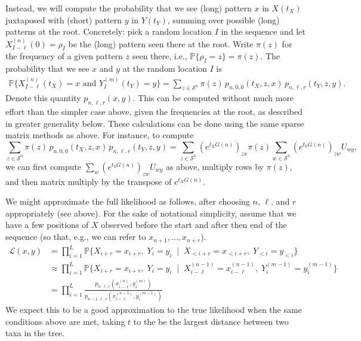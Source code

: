 \documentclass{article}
\renewcommand{\P}{\mathbb{P}}
\newcommand{\calS}{\mathcal{S}}  %
\newcommand{\given}{\;\mid\;}
\newcommand{\like}{\mathcal L}
\theoremstyle{plain}
\theoremstyle{definition}
\begin{document}
Instead, we will compute the probability that
we see (long) pattern $x$ in $X(t_X)$ juxtaposed with (short) pattern $y$ in $Y(t_Y)$,
summing over possible (long) patterns at the root.
Concretely: pick a random location $I$ in the sequence
and let $X_{I-\ell}^{(n)}(0) = \rho_I$ be the (long) pattern seen there at the root.
Write $\pi(z)$ for the frequency of a given pattern $z$ seen there, i.e., $\P\{\rho_I=z\}=\pi(z)$.
The probability that we see $x$ and $y$ at the random location $I$ is
\begin{align} \label{eqn:phylo_likelihood}
    \P\{X_{I-\ell}^{(n)}(t_X)=x \text{ and } Y_I^{(m)}(t_Y)=y \}
    =
    \sum_{z \in \calS^{n}} \pi(z) \, p_{n,0,0}(t_X,z,x) \, p_{n,\ell,r}(t_Y,z,y) .
\end{align}
Denote this quantity $p_{n,\ell,r}(x, y)$.
This can be computed without much more effort than the simpler case above,
given the frequencies at the root, as described in greater generality below.
These calculations can be done using the same sparse matrix methods as above.
For instance, to compute
\[
    \sum_{z \in \calS^{n}}
        \pi(z) \, p_{n,0,0}(t_X,z,x) \, p_{n,\ell,r}(t_Y,z,y)
    =
    \sum_{z \in \calS^{n}}
    \left( e^{t_X G(n)} \right)_{zx}
    \pi(z)
    \sum_{w \in \calS^{n}} \left( e^{t_Y G(n)} \right)_{zw} U_{wy} ,
\]
we can first compute $\sum_w \left( e^{t_Y G(n)} \right)_{zw} U_{wy}$ as above,
multiply rows by $\pi(z)$, and then matrix multiply by the transpose of $e^{t_X G(n)}$.

We might approximate the full likelihood as follows,
after choosing $n$, $\ell$, and $r$ appropriately (see above).
For the sake of notational simplicity, assume that we have a few positions
of $X$ observed before the start and after then end of the sequence
(so that, e.g., we can refer to $x_{n+1}, \ldots, x_{n+r}$).
\begin{align*}
    \like(x, y)
    &=
    \prod_{i=1}^L
        \P\{ X_{i+r} = x_{i+r},\; Y_i = y_i
            \given X_{<i+r} = x_{<i+r},\; Y_{<i} = y_{<i} \} \\
    &\approx
    \prod_{i=1}^L
        \P\{ X_{i+r} = x_{i+r},\; Y_i = y_i
            \given X_{i-\ell}^{(n-1)} = x_{i-\ell}^{(n-1)},\; Y_{i}^{(m-1)} = y_{i}^{(m-1)} \} \\
    &=
    \prod_{i=1}^L
    \frac{
        p_{n,\ell,r}\left( x_{i-\ell}^{(n)}, y_i^{(m)} \right)
    }{
        p_{n-1,\ell,r}\left( x_{i-\ell}^{(n-1)}, y_i^{(m-1)} \right)
    }
\end{align*}
We expect this to be a good approximation to the true likelihood
when the same conditions above are met, taking $t$ to the be the largest distance
between two taxa in the tree.
\end{document}
